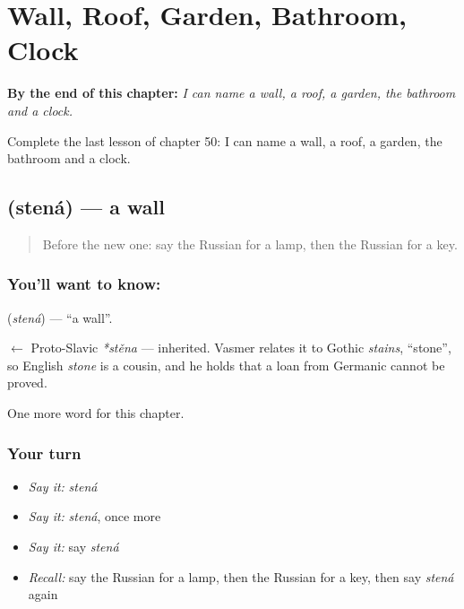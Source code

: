 
\chapter{Wall, Roof, Garden, Bathroom, Clock}
\label{ch:ru-wall-roof-garden-bathroom-clock}

\begin{chapteropening}
\textbf{By the end of this chapter:} \emph{I can name a wall, a roof, a garden, the bathroom and a clock.}

Complete the last lesson of chapter 50: I can name a wall, a roof, a garden, the bathroom and a clock.
\end{chapteropening}

\section[\texorpdfstring{\ru{стена} (stená)}{стена (stená)}]{ (stená) — a wall}

\label{lesson:RU-C50-wall}



\begin{quote}
Before the new one: say the Russian for a lamp, then the Russian for a key.
\end{quote}

\subsection*{You'll want to know: }
\textbf{} (\emph{stená}) — \textquotedblleft{}a wall\textquotedblright{}.

\begin{cousinweb}
\textbf{} $\leftarrow$ Proto-Slavic \emph{*stěna} — inherited. Vasmer relates it to Gothic \emph{stains}, \textquotedblleft{}stone\textquotedblright{}, so English \emph{stone} is a cousin, and he holds that a loan from Germanic cannot be proved.
\end{cousinweb}

\begin{grammarlens}[title={What you've built}]
One more word for this chapter.
\end{grammarlens}

\subsection*{Your turn}
\begin{itemize}
\raggedright
  \item \emph{Say it:} \emph{stená}
  \item \emph{Say it:} \emph{stená}, once more
  \item \emph{Say it:} say \emph{stená}
  \item \emph{Recall:} say the Russian for a lamp, then the Russian for a key, then say \emph{stená} again
\end{itemize}

